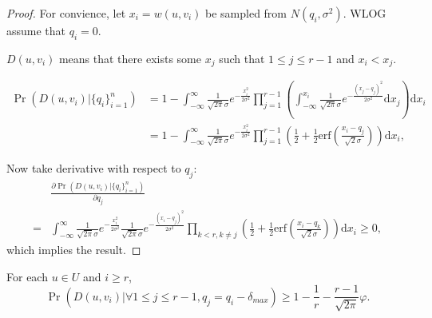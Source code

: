 \begin{proof}
    For convience, let $x_i = w(u, v_i)$ be sampled from $N(q_i, \sigma^2)$.
    WLOG assume that $q_i = 0$.

    $D(u, v_i)$ means that there exists some $x_j$ such that $1 \le j \le r-1$ and $x_i < x_j$.

    \begin{align*}
        \Pr(D(u, v_i) | \{q_i\}_{i=1}^n) &= 1 - \int_{-\infty}^{\infty} \frac{1}{\sqrt{2 \pi}\sigma} e^{-\frac{x_i^2}{2\sigma^2}}
    \prod_{j=1}^{r-1} \left(\int_{-\infty}^{x_i} \frac{1}{\sqrt{2\pi}\sigma} e^{-\frac{(x_j - q_j)^2}{2\sigma^2}}\mathrm{d} x_j \right) \mathrm{d} x_i \\
    &= 1 - \int_{-\infty}^{\infty} \frac{1}{\sqrt{2 \pi}\sigma} e^{-\frac{x_i^2}{2\sigma^2}}
    \prod_{j=1}^{r-1}\left(\frac{1}{2} + \frac{1}{2}\mathrm{erf}\left(\frac{x_i - q_j}{\sqrt{2}\sigma}\right)\right) \mathrm{d} x_i,
    \end{align*}

    Now take derivative with respect to $q_j$:
    \begin{align*}
        & \frac{\partial\Pr(D(u, v_i) | \{q_i\}_{i=1}^n)}{\partial q_j} \\
        = &\int_{-\infty}^{\infty} \frac{1}{\sqrt{2 \pi}\sigma} e^{-\frac{x_i^2}{2\sigma^2}}
        \frac{1}{\sqrt{2 \pi} \sigma} e^{-\frac{(x_i-q_j)^2}{2\sigma^2}}
        \prod_{k<r,k\neq j}\left(\frac{1}{2} + \frac{1}{2}\mathrm{erf}\left(\frac{x_i - q_k}{\sqrt{2}\sigma}\right)\right) \mathrm{d} x_i
        \ge 0,
    \end{align*}
    which implies the result.
\end{proof}

\begin{proposition} \label{proposition2}
    For each $u \in U$ and $i \ge r$,
    $$ \Pr(D(u, v_i) | \forall 1 \le j \le r-1, q_j = q_i - \delta_{max}) \ge 1 - \frac{1}{r} - \frac{r - 1}{\sqrt{2\pi}}\varphi. $$
\end{proposition}

